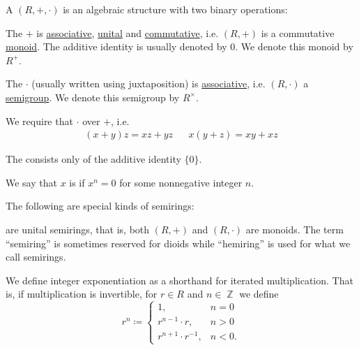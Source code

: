 \begin{definition}\label{def:semiring}
  A  \( (R, +, \cdot) \) is an algebraic structure with two binary operations:
  \begin{thmenum}[series=def:semiring]
     The  \( + \) is \hyperref[def:magma/associative]{associative}, \hyperref[def:unital_magma]{unital} and \hyperref[def:magma/commutative]{commutative}, i.e. \( (R, +) \) is a commutative \hyperref[def:unital_magma/associative]{monoid}. The additive identity is usually denoted by \( 0 \). We denote this monoid by \( R^+ \).

     The  \( \cdot \) (usually written using juxtaposition) is \hyperref[def:magma/associative]{associative}, i.e. \( (R, \cdot) \) a \hyperref[def:magma/associative]{semigroup}. We denote this semigroup by \( R^\times \).

     We require that \( \cdot \)  over \( + \), i.e.
    \begin{align}\label{eq:def:semiring/distributivity}
      (x + y)z = xz + yz
      &&
      x(y + z) = xy + xz
    \end{align}
  \end{thmenum}

  The  consists only of the additive identity \( \{ 0 \} \).

  We say that \( x \) is  if \( x^n = 0 \) for some nonnegative integer \( n \).

  The following are special kinds of semirings:
  \begin{thmenum}[resume=def:semiring]
      are unital semirings, that is, both \( (R, +) \) and \( (R, \cdot) \) are monoids. The term \enquote{semiring} is sometimes reserved for dioids while \enquote{hemiring} is used for what we call semirings.

    We define integer exponentiation as a shorthand for iterated multiplication. That is, if multiplication is invertible, for \( r \in R \) and \( n \in \BbbZ \) we define
    \begin{equation*}
      r^n \coloneqq \begin{cases}
        1,                      & n = 0  \\
        r^{n - 1} \cdot r,      & n > 0  \\
        r^{n + 1} \cdot r^{-1}, & n < 0.
      \end{cases}
    \end{equation*}


\end{thmenum}
\end{definition}
